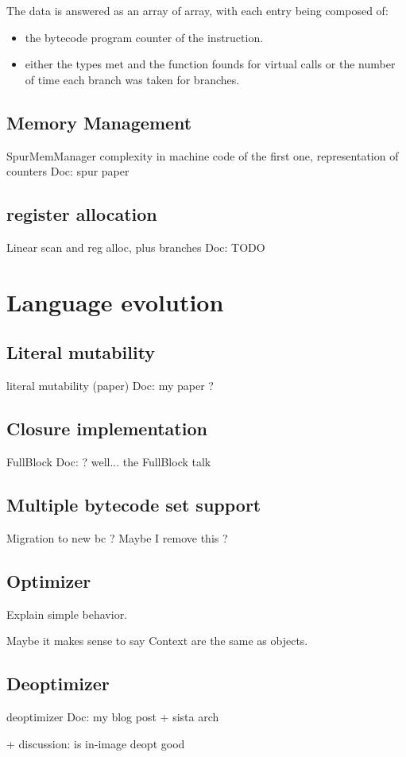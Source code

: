 \documentclass[a4paper,12pt,twoside]{../includes/ThesisStyle}
\begin{document}
The data is answered as an array of array, with each entry being composed of:
\begin{itemize}
\item the bytecode program counter of the instruction.
\item either the types met and the function founds for virtual calls or the number of time each branch was taken for branches.
\end{itemize}


\subsection{Memory Management}

SpurMemManager complexity in machine code of the first one, representation of counters
Doc: spur paper

\subsection{register allocation}

Linear scan and reg alloc, plus branches
Doc: TODO


\section{Language evolution}

\subsection{Literal mutability}

literal mutability (paper)
Doc: my paper ?

\subsection{Closure implementation}
FullBlock
Doc: ? well... the FullBlock talk

\subsection{Multiple bytecode set support}
Migration to new bc ? Maybe I remove this ?

\subsection{Optimizer}

Explain simple behavior.

Maybe it makes sense to say Context are the same as objects.

\subsection{Deoptimizer}
deoptimizer 
Doc: my blog post + sista arch

+ discussion: is in-image deopt good


\ifx\wholebook\relax\else
    
\end{document}
